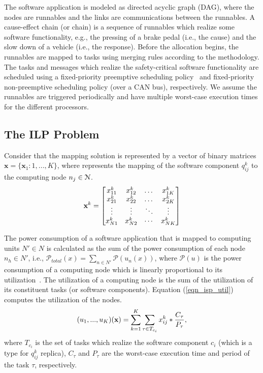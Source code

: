 The software application is modeled as directed acyclic graph (DAG), where the nodes are runnables and the links are communications between the runnables. A cause-effect chain (or chain) is a sequence of runnables which realize some software functionality, e.g., the pressing of a brake pedal (i.e., the cause) and the slow down of a vehicle (i.e., the response). Before the allocation begins, the runnables are mapped to tasks using merging rules according to the \autosar{} methodology. The tasks and messages which realize the safety-critical software functionality are scheduled using a fixed-priority preemptive scheduling policy~\cite{Sha2004RealPerspective} and fixed-priority non-preemptive scheduling policy (over a  CAN bus), respectively. We assume the runnables are triggered periodically and have multiple worst-case execution times for the different processors.

\subsection*{The ILP Problem}
Consider that the mapping solution is represented by a vector of binary matrices $\textbf{x}=\{\textbf{x}_1:1,...,K\}$, where \ttxkij{} represents the mapping of the software component $q^{k}_{ij}$ to the computing node $\ssb{n}[j]\in \mathcal{N}$. 
\begin{equation}
\label{eqn_solution}
\bspx{k}=
\begin{bmatrix} 
\ssx{k}{11} & \ssx{k}{12} & \dots & \ssx{k}{1K}\\
\ssx{k}{21} & \ssx{k}{22} & \dots & \ssx{k}{2K}\\
\vdots & \vdots & \ddots & \vdots\\
\ssx{k}{N1} & \ssx{k}{N2} & \cdots & \ssx{k}{NK}
\end{bmatrix}
\end{equation}

The power consumption of a software application that is mapped to computing units $N'\in N$ is calculated as the sum of the power consumption of each node $n_h\in N'$, i.e., $\mathcal{P}_{total}(x)=\sum_{n\in N'}{\mathcal{P}(u_n(x))}$, where $\mathcal{P}(u)$ is the power consumption of a computing node which is linearly proportional to its utilization~\cite{Mahmud5222}. The utilization of a computing node is the sum of the utilization of its constituent tasks (or software components). Equation (\ref{eqn_isp_util}) computes the utilization of the nodes.
\begin{align}
\label{eqn_isp_util}
	(u_1,...,u_K)(\x)=\sum_{k=1}^{K}\sum_{\tau\in T_{c_i}}{\xkij*\frac{C_\tau}{P_\tau}},
\end{align}
where $T_{c_i}$ is the set of tasks which realize the software component $c_i$ (which is a type for $q^{k}_{ij}$ replica), $C_\tau$ and $P_\tau$ are the worst-case execution time and  period of the task $\tau$, respectively.

